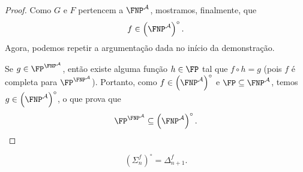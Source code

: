 \begin{proof}
    Como $G$ e $F$ pertencem a $\FNP^\mathcal A$,
    mostramos, finalmente, que
    \begin{equation*}
        f \in \left(\FNP^\mathcal A\right) ^ \circ.
    \end{equation*}
    Agora, podemos repetir a argumentação dada no início da demonstração.

    Se $g \in \FP^{\FNP^\mathcal A}$,
    então existe alguma função $h \in \FP$
    tal que $f \circ h = g$
    (pois $f$ é completa para $\FP^{\FNP^\mathcal A}$).
    Portanto,
    como $f \in \left( \FNP^\mathcal A \right) ^ \circ$
    e $\FP \subseteq \FNP^\mathcal A$,
    temos $g \in \left( \FNP^\mathcal A \right) ^ \circ$,
    o que prova que
    \begin{equation*}
        \FP^{\FNP^\mathcal A} \subseteq \left( \FNP^\mathcal A \right) ^ \circ.
    \end{equation*}
\end{proof}

\begin{ucorollary}
    \begin{equation*}
        (\Sigma_n^f) ^ \circ = \Delta_{n+1}^f.
    \end{equation*}
\end{ucorollary}
